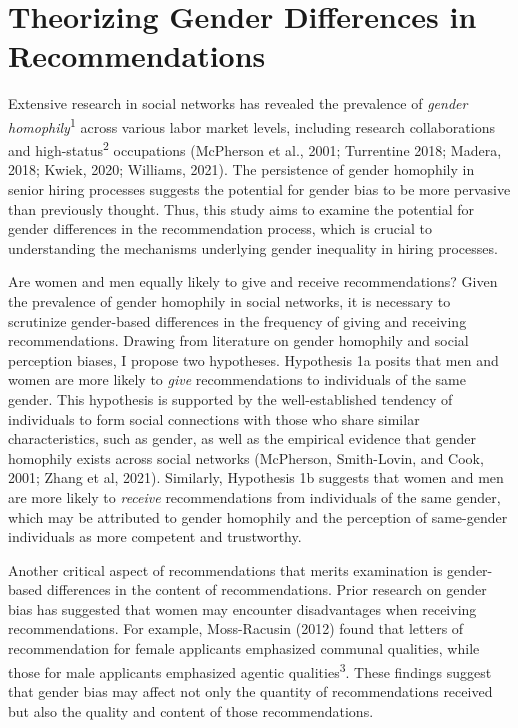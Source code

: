 \documentclass[12pt]{caltech_thesis}
\begin{document}
\section{Theorizing Gender Differences in Recommendations}
Extensive research in social networks has revealed the prevalence of \textit{gender homophily}\textsuperscript{1} across various labor market levels, including research collaborations and high-status\textsuperscript{2} occupations (McPherson et al., 2001; Turrentine 2018; Madera, 2018; Kwiek, 2020; Williams, 2021). The persistence of gender homophily in senior hiring processes suggests the potential for gender bias to be more pervasive than previously thought. Thus, this study aims to examine the potential for gender differences in the recommendation process, which is crucial to understanding the mechanisms underlying gender inequality in hiring processes. 

Are women and men equally likely to give and receive recommendations? Given the prevalence of gender homophily in social networks, it is necessary to scrutinize gender-based differences in the frequency of giving and receiving recommendations. Drawing from literature on gender homophily and social perception biases, I propose two hypotheses. Hypothesis 1a posits that men and women are more likely to \textit{give} recommendations to individuals of the same gender. This hypothesis is supported by the well-established tendency of individuals to form social connections with those who share similar characteristics, such as gender, as well as the empirical evidence that gender homophily exists across social networks (McPherson, Smith-Lovin, and Cook, 2001; Zhang et al, 2021). Similarly, Hypothesis 1b suggests that women and men are more likely to \textit{receive} recommendations from individuals of the same gender, which may be attributed to gender homophily and the perception of same-gender individuals as more competent and trustworthy. 

Another critical aspect of recommendations that merits examination is gender-based differences in the content of recommendations. Prior research on gender bias has suggested that women may encounter disadvantages when receiving recommendations. For example, Moss-Racusin (2012) found that letters of recommendation for female applicants emphasized communal qualities, while those for male applicants emphasized agentic qualities\textsuperscript{3}. These findings suggest that gender bias may affect not only the quantity of recommendations received but also the quality and content of those recommendations.
\end{document}
